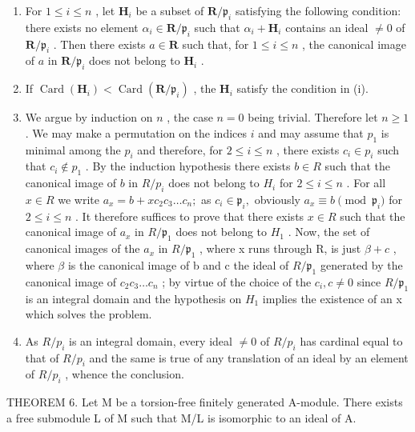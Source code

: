 \begin{enumerate}
\def\labelenumi{(\roman{enumi})}
\item
  For \(1 \leqslant i \leqslant n\) , let \(\mathbf{H}_i\) be a subset of \(\mathbf{R} / \mathfrak{p}_i\) satisfying the following condition: there exists no element \(\alpha_i \in \mathbf{R} / \mathfrak{p}_i\) such that \(\alpha_i + \mathbf{H}_i\) contains an ideal \(\neq 0\) of \(\mathbf{R} / \mathfrak{p}_i\) . Then there exists \(a \in \mathbf{R}\) such that, for \(1 \leqslant i \leqslant n\) , the canonical image of \(a\) in \(\mathbf{R} / \mathfrak{p}_i\) does not belong to \(\mathbf{H}_i\) .
\item
  If \(\operatorname{Card}(\mathbf{H}_i) < \operatorname{Card}(\mathbf{R} / \mathfrak{p}_i)\) , the \(\mathbf{H}_i\) satisfy the condition in (i).
\item
  We argue by induction on \(n\) , the case \(n = 0\) being trivial. Therefore let \(n \geqslant 1\) . We may make a permutation on the indices \(i\) and may assume that \(p_1\) is minimal among the \(p_i\) and therefore, for \(2 \leqslant i \leqslant n\) , there exists \(c_i \in p_i\) such that \(c_i \notin p_1\) . By the induction hypothesis there exists \(b \in R\) such that the canonical image of \(b\) in \(R / p_i\) does not belong to \(H_i\) for \(2 \leqslant i \leqslant n\) . For all \(x \in R\) we write \(a_{x}=b+xc_{2}c_{3}\ldots c_{n};\) as \(c_{i}\in\mathfrak{p}_{i},\) obviously \(a_{x}\equiv b\pmod{\mathfrak{p}_{i}}\) for \(2\leqslant i\leqslant n\) . It therefore suffices to prove that there exists \(x\in R\) such that the canonical image of \(a_{x}\) in \(R/\mathfrak{p}_{1}\) does not belong to \(H_{1}\) . Now, the set of canonical images of the \(a_{x}\) in \(R/\mathfrak{p}_{1}\) , where x runs through R, is just \(\beta+c\) , where \(\beta\) is the canonical image of b and c the ideal of \(R/\mathfrak{p}_{1}\) generated by the canonical image of \(c_{2}c_{3}\ldots c_{n}\) ; by virtue of the choice of the \(c_{i},c\neq0\) since \(R/\mathfrak{p}_{1}\) is an integral domain and the hypothesis on \(H_{1}\) implies the existence of an x which solves the problem.
\item
  As \(R/p_{i}\) is an integral domain, every ideal \(\neq0\) of \(R/p_{i}\) has cardinal equal to that of \(R/p_{i}\) and the same is true of any translation of an ideal by an element of \(R/p_{i}\) , whence the conclusion.
\end{enumerate}

THEOREM 6. Let M be a torsion-free finitely generated A-module. There exists a free submodule L of M such that M/L is isomorphic to an ideal of A.

